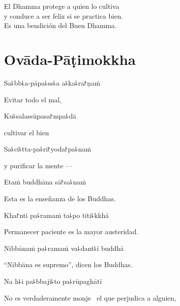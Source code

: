 \begin{english}
  El Dhamma protege a quien lo cultiva\\
  y conduce a ser feliz si se practica bien.\\
  Es una bendición del Buen Dhamma.
\end{english}

\chapter{Ovāda-Pāṭimokkha}


\enlargethispage{\baselineskip}

\begin{leader}
\end{leader}

Sa꜕bb꜕a-pāpa꜕ss꜕a a꜕ka꜕ra꜓ṇaṁ
	
	\begin{english}
		Evitar todo el mal,
	\end{english}
	
	Ku꜕salassūpasa꜓mpa꜕dā
	
	\begin{english}
		cultivar el bien
	\end{english}
	
	Sa꜕ci꜕tta-pa꜕ri꜓yoda꜓pa꜕naṁ
	
	\begin{english}
		y purificar la mente ---
	\end{english}
	
	Etaṁ buddhāna sā꜓sa꜕naṁ
	
	\begin{english}
		Esta es la enseñanza de los Buddhas.
	\end{english}


Kha꜓ntī pa꜕ramaṁ ta꜕po tīti꜕kkhā

\begin{english}
  Permanecer paciente es la mayor austeridad.
\end{english}

Nibbānaṁ pa꜕ramaṁ va꜕dant꜕i buddhā

\begin{english}
  “Nibbāna es supremo”, dicen los Buddhas.
\end{english}

Na h꜕i pa꜕bbaji꜕to pa꜕rūpaghātī

\begin{english}
  No es verdaderamente monje \pause\ el que perjudica a alguien,
\end{english}

